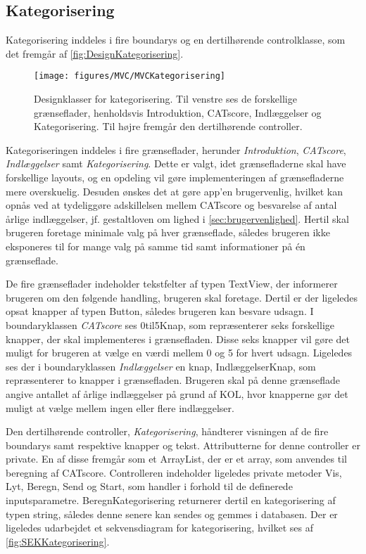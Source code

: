 \subsection*{Kategorisering}
Kategorisering inddeles i fire boundarys og en dertilhørende controlklasse, som det fremgår af \autoref{fig:DesignKategorisering}.

\begin{figure} [H]
\centering
\texttt{[image: figures/MVC/MVCKategorisering]}
\caption{Designklasser for kategorisering. Til venstre ses de forskellige grænseflader, henholdsvis Introduktion, CATscore, Indlæggelser og Kategorisering. Til højre fremgår den dertilhørende controller.}
\label{fig:DesignKategorisering}
\end{figure}

\noindent
Kategoriseringen inddeles i fire grænseflader, herunder \textit{Introduktion}, \textit{CATscore}, \textit{Indlæggelser} samt \textit{Kategorisering}. Dette er valgt, idet grænsefladerne skal have forskellige layouts, og en opdeling vil gøre implementeringen af grænsefladerne mere overskuelig. Desuden ønskes det at gøre app’en brugervenlig, hvilket kan opnås ved at tydeliggøre adskillelsen mellem CATscore og besvarelse af antal årlige indlæggelser, jf. gestaltloven om lighed i \autoref{sec:brugervenlighed}. Hertil skal brugeren foretage minimale valg på hver grænseflade, således
brugeren ikke eksponeres til for mange valg på samme tid samt informationer på én grænseflade.

De fire grænseflader indeholder tekstfelter af typen TextView, der informerer brugeren om den følgende handling, brugeren skal foretage. Dertil er der ligeledes opsat knapper af typen Button, således brugeren kan besvare udsagn. I boundaryklassen \textit{CATscore} ses 0til5Knap, som repræsenterer seks forskellige knapper, der skal implementeres i grænsefladen. Disse seks knapper vil gøre det muligt for brugeren at vælge en værdi mellem 0 og 5 for hvert udsagn. Ligeledes ses der i boundaryklassen \textit{Indlæggelser} en knap, IndlæggelserKnap, som repræsenterer to knapper i grænsefladen. Brugeren skal på denne grænseflade angive antallet af årlige indlæggelser på grund af KOL, hvor knapperne gør det muligt at vælge mellem ingen eller flere indlæggelser.

Den dertilhørende controller, \textit{Kategorisering}, håndterer visningen af de fire boundarys samt respektive knapper og tekst. Attributterne for denne controller er private. En af disse fremgår som et ArrayList, der er et array, som anvendes til beregning af CATscore. Controlleren indeholder ligeledes private metoder Vis, Lyt, Beregn, Send og Start, som handler i forhold til de definerede inputsparametre. BeregnKategorisering returnerer dertil en kategorisering af typen string, således denne senere kan sendes og gemmes i databasen. Der er ligeledes udarbejdet et sekvensdiagram for kategorisering, hvilket ses af \autoref{fig:SEKKategorisering}.

